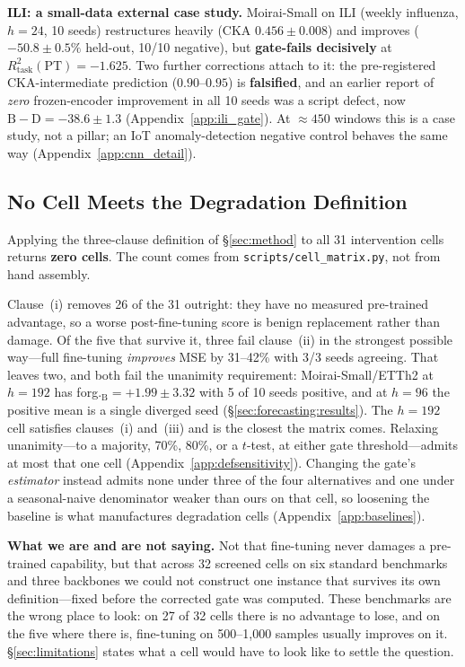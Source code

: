 \textbf{ILI: a small-data external case study.}
\label{sec:analysis:ili}
Moirai-Small on ILI (weekly influenza, $h{=}24$, 10 seeds) restructures heavily
(CKA $0.456{\pm}0.008$) and improves ($-50.8{\pm}0.5\%$ held-out, 10/10
negative), but \textbf{gate-fails decisively} at
$R^2_\text{task}(\text{PT}){=}{-}1.625$.  Two further corrections attach to it:
the pre-registered CKA-intermediate prediction ($0.90$--$0.95$) is
\textbf{falsified}, and an earlier report of \emph{zero} frozen-encoder
improvement in all 10 seeds was a script defect, now
$\text{B}{-}\text{D}{=}{-}38.6{\pm}1.3$ (Appendix~\ref{app:ili_gate}).  At
${\approx}450$ windows this is a case study, not a pillar; an IoT
anomaly-detection negative control behaves the same way
(Appendix~\ref{app:cnn_detail}).

\subsection{No Cell Meets the Degradation Definition}
\label{sec:analysis:degradation}

Applying the three-clause definition of \S\ref{sec:method} to all 31
intervention cells returns \textbf{zero cells}.  The count comes from
\texttt{scripts/cell\_matrix.py}, not from hand assembly.

Clause~(i) removes 26 of the 31 outright: they have no measured pre-trained
advantage, so a worse post-fine-tuning score is benign replacement rather than
damage.  Of the five that survive it, three fail clause~(ii) in the strongest
possible way---full fine-tuning \emph{improves} MSE by 31--42\% with 3/3 seeds
agreeing.  That leaves two, and both fail the unanimity requirement:
Moirai-Small/ETTh2 at $h{=}192$ has forg.$_\text{B}{=}{+}1.99{\pm}3.32$ with 5
of 10 seeds positive, and at $h{=}96$ the positive mean is a single diverged
seed (\S\ref{sec:forecasting:results}).  The $h{=}192$ cell satisfies
clauses~(i) and~(iii) and is the closest the matrix comes.  Relaxing
unanimity---to a majority, 70\%, 80\%, or a $t$-test, at either gate
threshold---admits at most that one cell (Appendix~\ref{app:defsensitivity}).
Changing the gate's \emph{estimator} instead admits none under three of the four
alternatives and one under a seasonal-naive denominator weaker than ours on that
cell, so loosening the baseline is what manufactures degradation cells
(Appendix~\ref{app:baselines}).

\textbf{What we are and are not saying.}  Not that fine-tuning never damages a
pre-trained capability, but that across 32 screened cells on six standard
benchmarks and three backbones we could not construct one instance that
survives its own definition---fixed before the corrected gate was computed.
These benchmarks are the wrong place to look: on 27 of 32 cells there is no
advantage to lose, and on the five where there is, fine-tuning on
500--1{,}000 samples usually improves on it.
\S\ref{sec:limitations} states what a cell would have to look like to settle
the question.

